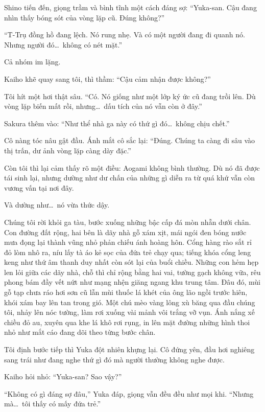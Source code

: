 \documentclass[../main.tex]{subfiles}
\begin{document}
Shino tiến đến, giọng trầm và bình tĩnh một cách đáng sợ: ``Yuka-san. Cậu đang nhìn thấy bóng sót của vòng lặp cũ. Đúng không?''

``T-Trụ đồng hồ đang lệch. Nó rung nhẹ. Và có một người đang đi quanh nó. Nhưng người đó\dots\ không có nét mặt.''

Cả nhóm im lặng.

Kaiho khẽ quay sang tôi, thì thầm: ``Cậu cảm nhận được không?''

Tôi hít một hơi thật sâu. ``Có. Nó giống như một lớp ký ức cũ đang trồi lên. Dù vòng lặp biến mất rồi, nhưng\dots\ dấu tích của nó vẫn còn ở đây.''

Sakura thêm vào: ``Như thể nhà ga này có thứ gì đó\dots\ không chịu chết.''

Cô nàng tóc nâu gật đầu. Ánh mắt cô sắc lại: ``Đúng. Chúng ta càng đi sâu vào thị trấn, dư ảnh vòng lặp càng dày đặc.''

Còn tôi thì lại cảm thấy rõ một điều: Aogami không bình thường. Dù nó đã được tái sinh lại, nhưng dường như dư chấn của những gì diễn ra từ quá khứ vẫn còn vương vấn tại nơi đây.

Và dường như\dots\ nó vừa thức dậy.

\ct

Chúng tôi rời khỏi ga tàu, bước xuống những bậc cấp đá mòn nhẵn dưới chân. Con đường đất rộng, hai bên là dãy nhà gỗ xám xịt, mái ngói đen bóng nước mưa đọng lại thành vũng nhỏ phản chiếu ánh hoàng hôn. Cổng hàng rào sắt rỉ đỏ lòm nhô ra, níu lấy tà áo kẻ sọc của đứa trẻ chạy qua; tiếng khóa cổng leng keng như thứ âm thanh duy nhất còn sót lại của buổi chiều. Những con hẻm hẹp len lỏi giữa các dãy nhà, chỗ thì chỉ rộng bằng hai vai, tường gạch không vữa, rêu phong bám đầy vết nứt như mạng nhện giăng ngang khu trung tâm. Đâu đó, mùi gỗ tạp chưa ráo hơi sơn cũ lẫn mùi thuốc lá khét của ông lão ngồi trước hiên, khói xám bay lên tan trong gió. Một chú mèo vàng lông xù băng qua đầu chúng tôi, nhảy lên nóc tường, làm rơi xuống vài mảnh vôi trắng vỡ vụn. Ánh nắng xế chiều đỏ au, xuyên qua khe lá khô rơi rụng, in lên mặt đường những hình thoi nhỏ như mắt cáo đang dõi theo từng bước chân.

Tôi định bước tiếp thì Yuka đột nhiên khựng lại. Cô đứng yên, đầu hơi nghiêng sang trái như đang nghe thứ gì đó mà người thường không nghe được.

Kaiho hỏi nhỏ: ``Yuka-san? Sao vậy?''

``Không có gì đáng sợ đâu,'' Yuka đáp, giọng vẫn đều đều như mọi khi. ``Nhưng mà\dots\ tôi thấy có mấy đứa trẻ.''
\end{document}
